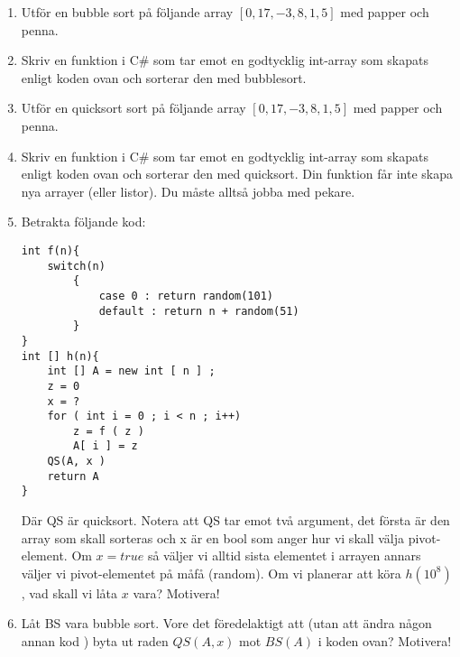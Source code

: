 \documentclass{article}
\begin{document}
\begin{enumerate}

       \item Utför en bubble sort på följande array $[0, 17, -3, 8, 1, 5]$ med papper och penna.
 	      
       \item Skriv en funktion i C\# som tar emot en godtycklig int-array som skapats enligt koden ovan och sorterar den med bubblesort.
       
       \item Utför en quicksort sort på följande array $[0, 17, -3, 8, 1, 5]$ med papper och penna.
       
       \item Skriv en funktion i C\# som tar emot en godtycklig int-array som skapats enligt koden ovan och sorterar den med quicksort. Din funktion får inte skapa nya arrayer
       (eller listor). Du måste alltså jobba med pekare.
       
       \item Betrakta följande kod: 
       \begin{lstlisting}
int f(n){
	switch(n)
		{
			case 0 : return random(101)
          	default : return n + random(51)
		}
}
int [] h(n){
	int [] A = new int [ n ] ;
	z = 0
	x = ?
	for ( int i = 0 ; i < n ; i++)
		z = f ( z )
		A[ i ] = z
	QS(A, x )
	return A
}
       \end{lstlisting}
Där QS är quicksort. Notera att QS tar emot två argument, det första är den array
som skall sorteras och x är en bool som anger hur vi skall välja pivot-element. Om
$x=true$ så väljer vi alltid sista elementet i arrayen annars väljer vi pivot-elementet på
måfå (random). Om vi planerar att köra $h(10^8)$, vad skall vi låta $x$ vara? Motivera!   

\item Låt BS vara bubble sort. Vore det föredelaktigt att (utan att ändra någon annan kod
) byta ut raden $QS(A, x)$ mot $BS(A)$ i koden ovan? Motivera!    
\end{enumerate}
\end{document}
